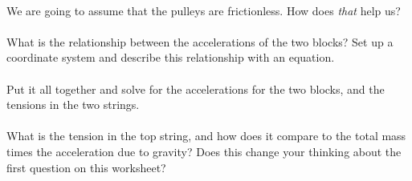 \documentclass[12pt]{article}
\begin{document}
\paragraph{\theproblem}%
We are going to assume that the pulleys are frictionless. How does
\emph{that} help us?

\paragraph{\theproblem}%
What is the relationship between the accelerations of the two blocks?
Set up a coordinate system and describe this relationship with an
equation.

\paragraph{\theproblem}%
Put it all together and solve for the accelerations for the two
blocks, and the tensions in the two strings.

\paragraph{\theproblem}%
What is the tension in the top string, and how does it compare to the
total mass times the acceleration due to gravity? Does this change
your thinking about the first question on this worksheet?
\end{document}

